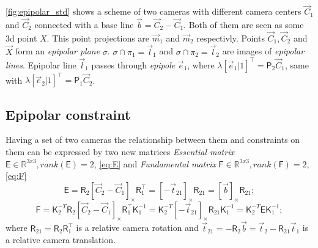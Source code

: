 \autoref{fig:epipolar_std} shows a scheme of two cameras with different camera centers $\vec{C}_1$ and $\vec{C}_2$ connected with a base line $\vec{b} = \vec{C}_2 - \vec{C}_1$. 
Both of them are seen as some 3d point $X$. 
This point projections are $\vec{m}_1$ and $\vec{m}_2$ respectivly. 
Points $\vec{C}_1, \vec{C}_2$ and $\vec{X}$ form an \textit{epipolar plane} $\sigma$.
$\sigma \cap \pi_1 = \vec{l}_1$ and $\sigma \cap \pi_2 = \vec{l}_2$ are images of \textit{epipolar lines}. 
Epipolar line $\vec{l}_1$ passes through \textit{epipole} $\vec{e}_1$, where $\lambda [\vec{e}_1 | 1]^\top = \pmb{\mathsf{P}}_2 \vec{C}_1$, same with $\lambda [\vec{e}_2 | 1]^\top = \pmb{\mathsf{P}}_1 \vec{C}_2$.

\subsection{Epipolar constraint}

Having a set of two cameras the relationship between them and constraints on them can be expressed by two new matrices \textit{Essential matrix} $\pmb{\mathsf{E}} \in \mathbb{R}^{3x3}, rank(\pmb{\mathsf{E}}) = 2$, \autoref{eq:E} and \textit{Fundamental matrix} $\pmb{\mathsf{F}} \in \mathbb{R}^{3x3}, rank(\pmb{\mathsf{F}}) = 2$, \autoref{eq:F}
\begin{equation}
    \label{eq:E}
    \pmb{\mathsf{E}} = \pmb{\mathsf{R}}_2 [\vec{C}_2 - \vec{C}_1]_{\times} \pmb{\mathsf{R}}_1^\top = [-\vec{t}_{21}]_{\times} \pmb{\mathsf{R}}_{21} = [\vec{b}]_{\times} \pmb{\mathsf{R}}_{21};
\end{equation}
\begin{equation}
    \label{eq:F}
    \pmb{\mathsf{F}} = \pmb{\mathsf{K}}_2^{-T} \pmb{\mathsf{R}}_2 [\vec{C}_2 - \vec{C}_1]_{\times} \pmb{\mathsf{R}}_1^\top \pmb{\mathsf{K}}_1^{-1} = 
    \pmb{\mathsf{K}}_2^{-T} [-\vec{t}_{21}]_{\times} \pmb{\mathsf{R}}_{21} \pmb{\mathsf{K}}_1^{-1} = 
    \pmb{\mathsf{K}}_2^{-T} \pmb{\mathsf{E}} \pmb{\mathsf{K}}_1^{-1};
\end{equation}
where 
$\pmb{\mathsf{R}}_{21} = \pmb{\mathsf{R}}_2 \pmb{\mathsf{R}}_1^\top$ is a relative camera rotation and 
$\vec{t}_{21} = -\pmb{\mathsf{R}}_2 \vec{b} = \vec{t}_2 - \pmb{\mathsf{R}}_{21}\vec{t}_1$ is a relative camera translation.

